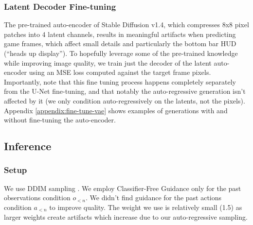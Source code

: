\documentclass{article} %
\begin{document}
\subsubsection{Latent Decoder Fine-tuning}
\label{sec:autoencoder fine tuning}

The pre-trained auto-encoder of Stable Diffusion v1.4, which compresses 8x8 pixel patches into 4 latent channels, results in meaningful artifacts when predicting game frames, which affect small details and particularly the bottom bar HUD (``heads up display'').
To hopefully leverage some of the pre-trained knowledge while improving image quality, we train just the decoder of the latent auto-encoder using an MSE loss computed against the target frame pixels.
Importantly, note that this fine tuning process happens completely separately from the U-Net fine-tuning, and that notably the auto-regressive generation isn't affected by it (we only condition auto-regressively on the latents, not the pixels).
Appendix \ref{appendix:fine-tune-vae} shows examples of generations with and without fine-tuning the auto-encoder.

\subsection{Inference}
\label{sec:inference}

\subsubsection{Setup}

We use DDIM sampling \citep{song2022denoisingdiffusionimplicitmodels}.
We employ Classifier-Free Guidance \citep{ho2022classifierfreediffusionguidance} only for the past observations condition $o_{<n}$.
We didn't find guidance for the past actions condition $a_{<n}$ to improve quality. The weight we use is relatively small (1.5) as larger weights create artifacts which increase due to our auto-regressive sampling. 
\end{document}

